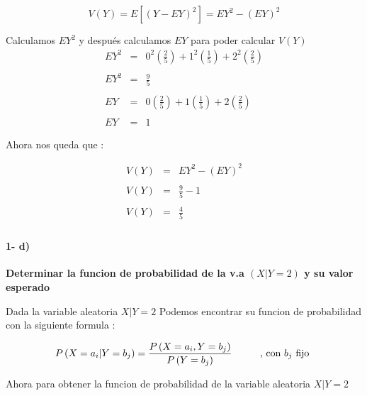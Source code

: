 \documentclass[12pt]{article}
\begin{document}
    \begin{equation*}
        V\left(Y\right) = E \left[\left(Y - EY\right)^2\right] = EY^2 - \left(EY\right)^2
    \end{equation*}

    Calculamos $EY^2$ y despu\'es calculamos $EY$ para poder calcular $V\left(Y\right)$
    \begin{equation*}
        \begin{array}{rcl}
            EY^2  & = & \displaystyle 0^2 \left(\frac{2}{5} \right)  + 1^2  \left(\frac{1}{5}\right) + 2^2 \left( \frac{2}{5}\right) 
            \\
            \\
            EY^2  & = & \displaystyle \frac{9}{5} 
            \\
            \\
            EY  & = & \displaystyle 0 \left(\frac{2}{5} \right)  + 1  \left(\frac{1}{5}\right) + 2 \left( \frac{2}{5}\right) 
            \\
            \\
            EY  & = & 1 
        \end{array}
    \end{equation*}

    Ahora nos queda que : 

    \begin{equation*}
        \begin{array}{rcl}
            V\left(Y\right) & = & EY^2 - \left(EY\right)^2 
            \\
            \\
            V\left(Y\right) & = & \displaystyle \frac{9}{5} - 1 
            \\
            \\
            V\left(Y\right) & = & \displaystyle \frac{4}{5}
            \\
        \end{array}
    \end{equation*}

    \paragraph*{1- d) }{\bf Determinar la funcion de probabilidad de la v.a $\left(X|Y = 2\right)$ y su valor esperado }
    
    Dada la variable aleatoria $ X | Y = 2 $ Podemos encontrar su funcion de probabilidad con la siguiente formula : 
    
    
    \begin{equation*}
        P \left(X = a_i | Y = b_j\right) = \frac{P\left(X = a_i , Y = b_j\right)}{P \left(Y = b_j\right)}
        \hspace*{1cm} 
        \mbox{, con $b_j$  fijo } 
    \end{equation*}

    Ahora para obtener la funcion de probabilidad de la variable aleatoria $ X|Y =2$
\end{document}
